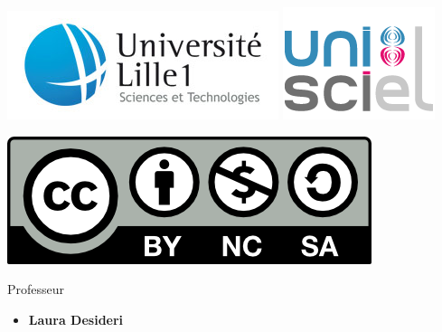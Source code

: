 





\begin{frame}

\thispagestyle{empty}    

  \hspace*{-20ex}
  \begin{minipage}{0.35\textwidth}
  \begin{center}
    \vspace*{5ex}   


    \bigskip

    \includegraphics[scale=0.3]{../divers/logotypeLille1-QUADRI-ECRAN.jpg}
   \quad
   \includegraphics[scale=0.3]{../divers/logo-unisciel.png}

    \vspace*{5ex}

    \includegraphics[scale=0.5]{../divers/by-nc-sa.png}
  \end{center}
  \end{minipage}
  \hfil
  \begin{minipage}{0.90\textwidth}
  \footnotesize
   \vspace*{2ex}
  Professeur
  \begin{itemize}
    \item {\bf Laura Desideri}  
  \end{itemize} 
  

\end{minipage}
\end{frame}
